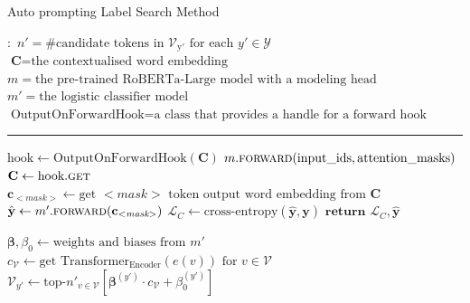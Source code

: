 \begin{algorithm}
\caption{Auto prompting Label Search Method} \label{alg:auto-label}
\begin{algorithmic}[1]
\small
\Require $\boldsymbol{:}$ 
\newline $n' = \text{\# candidate tokens in $\mathcal{V}_{\text{y}'}$ for each $y' \in \mathcal{Y}$}$ 
\newline $\textbf{C} = \text{the contextualised word embedding}$
\newline $m = \text{the pre-trained RoBERTa-Large model with a modeling head}$
\newline $m' = \text{the logistic classifier model}$
\newline $\text{OutputOnForwardHook} = \text{a class that provides a handle for a forward hook}$
\vspace{0.3em}
\hrule
\vspace{0.3em}

\State $\text{hook} \gets \text{OutputOnForwardHook}(\textbf{C})$
{\color{mylightgrey}}
    \State $m.\Call{forward}{\text{input\_ids}, \text{attention\_masks}}$
    {\color{mylightgrey}}
    \State $\textbf{C} \gets \text{hook}.\Call{get}{}$
    {\color{mylightgrey}}
    \State $\textbf{c}_\text{$<$$\textit{mask}$$>$} \gets \text{get $<$$\textit{mask}$$>$ token output word embedding from $\textbf{C}$}$
    \State $\hat{\textbf{y}} \gets m'.\Call{forward}{\textbf{c}_\text{$<$$\textit{mask}$$>$}}$
    {\color{mylightgrey}}
    \State $\mathcal{L}_C \gets \text{cross-entropy}(\hat{\textbf{y}}, \textbf{y})$
    {\color{mylightgrey}}
    \State $\textbf{return } \mathcal{L}_C, \hat{\textbf{y}}$
    {\color{mylightgrey}}
\EndFunction

    \State $\boldsymbol{\beta}, \beta_0 \gets \text{weights and biases from $m'$}$
    {\color{mylightgrey}}
    \State $c_\mathcal{V} \gets \text{get $\text{Transformer}_{\text{Encoder}}(e(v))$ for $v \in \mathcal{V}$}$
    {\color{mylightgrey}}
        \State $\mathcal{V}_{y'} \gets \text{top-}n'_{v \in \mathcal{V}}[\boldsymbol{\beta}^{(y')} \cdot c_\mathcal{V} + \beta_0^{(y')}]$
        {\color{mylightgrey}}    
    \EndFor
    
\EndFunction
\end{algorithmic}
\end{algorithm}

